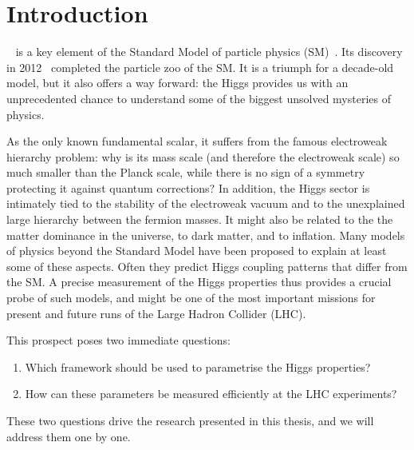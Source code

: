 

\chapter{Introduction}
\label{chapter:Introduction}

~\cite{Higgs:1964ia, Higgs:1964pj,
  Englert:1964et} is a key element of the Standard Model of particle
physics (SM)~\cite{Glashow:1961tr, Weinberg:1967tq, Salam:1968rm}. Its
discovery in 2012~\cite{Aad:2012tfa, Chatrchyan:2012xdj} completed the
particle zoo of the SM. It is a triumph for a decade-old model, but it
also offers a way forward: the Higgs provides us with an
unprecedented chance to understand some of the biggest unsolved
mysteries of physics.

As the only known fundamental scalar, it suffers from the famous
electroweak hierarchy problem: why is its mass scale (and therefore
the electroweak scale) so much smaller than the Planck scale, while
there is no sign of a symmetry protecting it against quantum
corrections? In addition, the Higgs sector is intimately tied to the
stability of the electroweak vacuum and to the unexplained large
hierarchy between the fermion masses. It might also be related to the
the matter dominance in the universe, to dark matter, and to inflation.
%
%
Many models of physics beyond the Standard Model have been proposed to
explain at least some of these aspects. Often they predict Higgs
coupling patterns that differ from the SM. A precise measurement of
the Higgs properties thus provides a crucial probe of such models, and
might be one of the most important missions for present and future
runs of the Large Hadron Collider (LHC).

This prospect poses two immediate questions:
%
\begin{enumerate}
\item Which framework should be used to parametrise the Higgs
  properties?
\item How can these parameters be measured efficiently at the LHC
  experiments?
\end{enumerate}
%
These two questions drive the research presented in this thesis, and
we will address them one by one.

